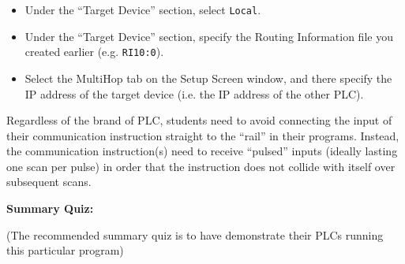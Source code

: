 \begin{itemize}
\vskip 5pt
\item{} Under the ``Target Device'' section, select {\tt Local}.
\vskip 5pt
\item{} Under the ``Target Device'' section, specify the Routing Information file you created earlier (e.g. {\tt RI10:0}).
\vskip 5pt
\item{} Select the MultiHop tab on the Setup Screen window, and there specify the IP address of the target device (i.e. the IP address of the other PLC).
\end{itemize}








Regardless of the brand of PLC, students need to avoid connecting the input of their communication instruction straight to the ``rail'' in their programs.  Instead, the communication instruction(s) need to receive ``pulsed'' inputs (ideally lasting one scan per pulse) in order that the instruction does not collide with itself over subsequent scans.




\vfil \eject

\noindent
{\bf Summary Quiz:}

(The recommended summary quiz is to have  demonstrate their PLCs running this particular program)




